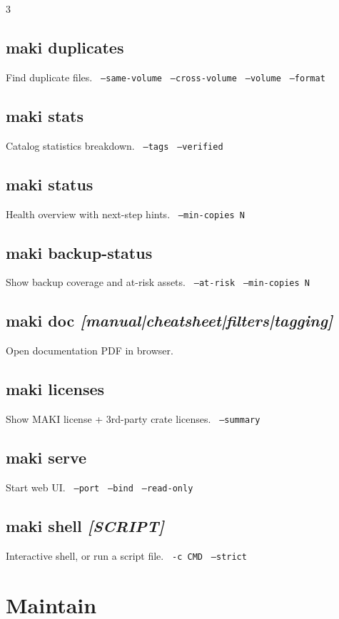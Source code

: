 \documentclass[a4paper,landscape,8pt]{article}
\newcommand{\opt}[1]{\texttt{\scriptsize\color{maki-stone} #1}}
\begin{document}
\begin{multicols}{3}
\subsection{maki duplicates}
Find duplicate files. \opt{--same-volume} \opt{--cross-volume} \opt{--volume} \opt{--format}

\subsection{maki stats}
Catalog statistics breakdown. \opt{--tags} \opt{--verified}

\subsection{maki status}
Health overview with next-step hints. \opt{--min-copies N}

\subsection{maki backup-status}
Show backup coverage and at-risk assets. \opt{--at-risk} \opt{--min-copies N}

\subsection{maki doc \textit{[manual|cheatsheet|filters|tagging]}}
Open documentation PDF in browser.

\subsection{maki licenses}
Show MAKI license + 3rd-party crate licenses. \opt{--summary}

\subsection{maki serve}
Start web UI. \opt{--port} \opt{--bind} \opt{--read-only}

\subsection{maki shell \textit{[SCRIPT]}}
Interactive shell, or run a script file. \opt{-c CMD} \opt{--strict}

\section{Maintain}


\end{multicols}
\end{document}
